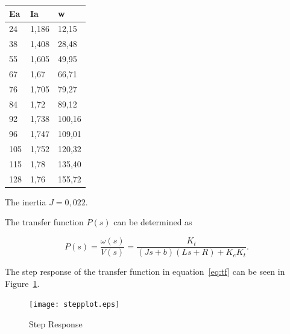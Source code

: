 \documentclass[a4paper,12pt]{article}
\numberwithin{equation}{section}
\numberwithin{figure}{section}
\numberwithin{table}{section}
\begin{document}
\begin{longtable}[]{@{}lll@{}}
\toprule
Ea & Ia & w\tabularnewline
\midrule
\endhead
24 & 1,186 & 12,15\tabularnewline
38 & 1,408 & 28,48\tabularnewline
55 & 1,605 & 49,95\tabularnewline
67 & 1,67 & 66,71\tabularnewline
76 & 1,705 & 79,27\tabularnewline
84 & 1,72 & 89,12\tabularnewline
92 & 1,738 & 100,16\tabularnewline
96 & 1,747 & 109,01\tabularnewline
105 & 1,752 & 120,32\tabularnewline
115 & 1,78 & 135,40\tabularnewline
128 & 1,76 & 155,72\tabularnewline
\bottomrule
\end{longtable}

The inertia $J = 0,022$.

The transfer function $P(s)$ can be determined as


 \begin{equation} \label{eq:tf}
P(s)=\frac{\omega(s)}{V(s)}=\frac{K_t}{(Js+b)(Ls+R)+K_eK_t}.

 \end{equation} 

 The step response of the transfer function in equation~\eqref{eq:tf} can be seen in Figure~\ref{fig:step}.

 \begin{figure}
    \centering
    \texttt{[image: stepplot.eps]}
    \caption{Step Response}
    \label{fig:step}
 \end{figure}
\end{document}
